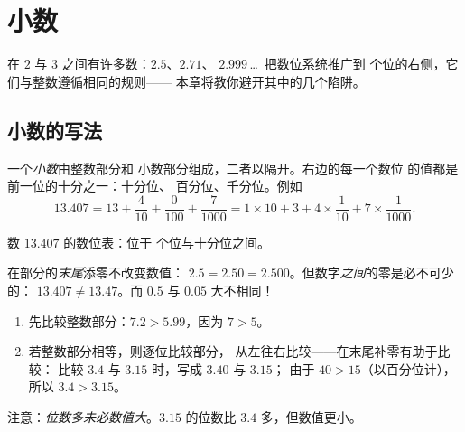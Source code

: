 \chapter{小数}\label{ch:g6:decimals}

在 $2$ 与 $3$ 之间有许多数：$2.5$、$2.71$、
$2.999$\,\dots\ 把数位系统推广到
个位的右侧，它们与整数遵循相同的规则——
本章将教你避开其中的几个陷阱。

\section{小数的写法}

\begin{definition}[小数的数位]\label{def:g6:decimals:places}
一个\emph{小数}由整数部分和
小数部分组成，二者以隔开。右边的每一个数位
的值都是前一位的十分之一：十分位、
百分位、千分位。例如
\[
13.407 = 13 + \frac{4}{10} + \frac{0}{100} + \frac{7}{1000}
= 1 \times 10 + 3 + 4 \times \frac{1}{10} + 7 \times \frac{1}{1000}.
\]
\end{definition}

\begin{omfigure}

{\small 数 $13.407$ 的数位表：位于
个位与十分位之间。}
\end{omfigure}

\begin{remark}[有意义的零与无意义的零]
在部分的\emph{末尾}添零不改变数值：
$2.5 = 2.50 = 2.500$。但数字\emph{之间}的零是必不可少的：
$13.407 \neq 13.47$。而 $0.5$ 与 $0.05$ 大不相同！
\end{remark}

\begin{method}[比较小数的大小]\label{met:g6:decimals:compare}
\begin{enumerate}
  \item 先比较整数部分：$7.2 > 5.99$，因为 $7 > 5$。
  \item 若整数部分相等，则逐位比较部分，
        从左往右比较——在末尾补零有助于比较：
        比较 $3.4$ 与 $3.15$ 时，写成 $3.40$ 与 $3.15$；
        由于 $40 > 15$（以百分位计），所以 $3.4 > 3.15$。
\end{enumerate}
注意：\emph{位数多未必数值大}。$3.15$ 的位数比
$3.4$ 多，但数值更小。
\end{method}

